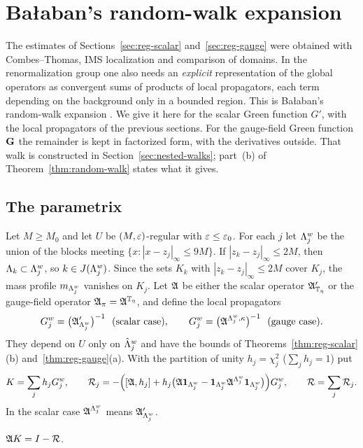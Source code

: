 \section{Ba\l aban's random-walk expansion}\label{sec:random-walk}

The estimates of Sections~\ref{sec:reg-scalar} and~\ref{sec:reg-gauge} were obtained with Combes--Thomas, IMS localization and comparison of domains. In the renormalization group one also needs an \emph{explicit} representation of the global operators as convergent sums of products of local propagators, each term depending on the background only in a bounded region. This is Ba\l aban's random-walk expansion \cite{BalGreen,BalPropII,BalBackground}. We give it here for the scalar Green function $G'$, with the local propagators of the previous sections. For the gauge-field Green function $\mathbf G$ the remainder is kept in factorized form, with the derivatives outside. That walk is constructed in Section~\ref{sec:nested-walks}; part~(b) of Theorem~\ref{thm:random-walk} states what it gives.

\subsection{The parametrix}\label{ss:20.1}

Let $M\ge M_0$ and let $U$ be $(M,\varepsilon)$-regular with $\varepsilon\le\varepsilon_0$. For each $j$ let $\Lambda^w_j$ be the union of the blocks meeting $\{x:|x-z_j|_\infty\le9M\}$. If $|z_k-z_j|_\infty\le2M$, then $\Lambda_k\subset\Lambda^w_j$, so $k\in J(\Lambda^w_j)$. Since the sets $K_k$ with $|z_k-z_j|_\infty\le2M$ cover $K_j$, the mass profile $m_{\Lambda^w_j}$ vanishes on $K_j$. Let $\mathfrak A$ be either the scalar operator $\mathfrak A'_{\mathbb T_\eta}$ or the gauge-field operator $\mathfrak A_\pi=\mathfrak A^{\mathbb T_\eta}$, and define the local propagators
\[
G^w_j=\big(\fA'_{\Lam^w_j}\big)^{-1}\ \ \text{(scalar case)},\qquad G^w_j=\big(\fA^{\Lam^w_j,\kappa}\big)^{-1}\ \ \text{(gauge case)}.
\]
They depend on $U$ only on $\hat{\Lambda}^w_j$ and have the bounds of Theorems~\ref{thm:reg-scalar}(b) and~\ref{thm:reg-gauge}(a). With the partition of unity $h_j=\chi_j^2$ ($\sum_jh_j=1$) put
\[
K=\sum_jh_jG^w_j,\qquad \mathcal R_j=-\Big([\mathfrak A,h_j]+h_j\big(\mathfrak A\mathbf 1_{\Lambda^w_j}-\mathbf 1_{\Lambda^w_j}\mathfrak A^{\Lambda^w_j}\mathbf 1_{\Lambda^w_j}\big)\Big)G^w_j,\qquad\mathcal R=\sum_j\mathcal R_j .
\]
In the scalar case $\mathfrak A^{\Lambda^w_j}$ means $\mathfrak A'_{\Lambda^w_j}$.

\begin{lemma}\label{lem:parametrix}
$\mathfrak A K=I-\mathcal R$.
\end{lemma}

